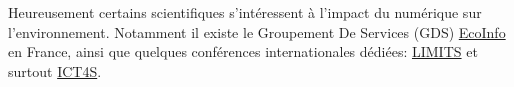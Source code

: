 \documentclass[10pt]{article}
\begin{document}
Heureusement certains scientifiques s'intéressent à l'impact du numérique sur l'environnement.
Notamment il existe le Groupement De Services (GDS) \href{https://ecoinfo.cnrs.fr/}{EcoInfo}
en France, ainsi que quelques conférences internationales dédiées:
\href{https://computingwithinlimits.org/}{LIMITS} et surtout
\href{https://dblp.org/db/conf/ict4s/index.html}{ICT4S}.
\end{document}
